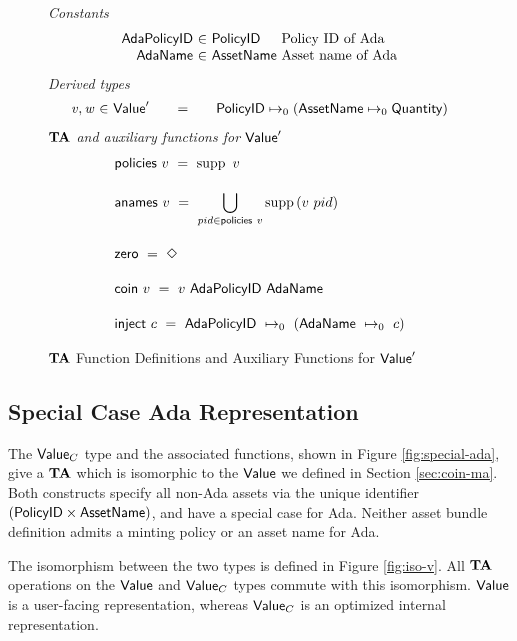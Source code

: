 \begin{figure*}[t!]
  \emph{Constants}
  \begin{equation*}
    \begin{array}{r@{~\in~}l@{~}lr}
      \mathsf{AdaPolicyID} & \PolicyID & \text{Policy ID of Ada} \\
      \mathsf{AdaName} & \AssetName & \text{Asset name of Ada}
    \end{array}
  \end{equation*}
  \emph{Derived types}
  \begin{equation*}
    \begin{array}{r@{~\in~}l@{\qquad=\qquad}lr}
      \var{v}, \var{w} & \Value'
      & \PolicyID \mapsto_0 ( \AssetName \mapsto_0 \Quantity )
    \end{array}
  \end{equation*}
  \emph{$\mathbf{TA}$ and auxiliary functions for $\mathsf{Value}'$}
  \begin{align*}
    & \fun{policies}~v ~=~ \supp{~v}
    \nextdef
    & \fun{anames}~v ~=~ \bigcup_{pid \in\fun{policies}{~v}} \supp{(v~pid)}
    \nextdef
    & \fun{zero} ~=~ \Nothing
    \nextdef
    & \fun{coin}~v ~=~ v~\mathsf{AdaPolicyID}~\mathsf{AdaName}
    \nextdef
    & \fun{inject}~c  ~=~ \mathsf{AdaPolicyID}~\mapsto_0~(\mathsf{AdaName}~\mapsto_0~c)
  \end{align*}
  \caption{$\mathbf{TA}$ Function Definitions and Auxiliary Functions for $\mathsf{Value}'$}
  \label{fig:no-special-ada}
\end{figure*}


\subsection{Special Case Ada Representation}
\label{sec:coin-value}

The $\mathsf{Value}_C$ type and the associated functions, shown in Figure \ref{fig:special-ada},
give a $\mathbf{TA}$ which is isomorphic to the $\mathsf{Value}$ we defined in
Section \ref{sec:coin-ma}. Both constructs
specify all non-Ada assets via the unique identifier $(\mathsf{PolicyID} \times \mathsf{AssetName})$, and
have a special case for Ada. Neither asset bundle definition
admits a minting policy or an asset name for Ada.

The isomorphism between the two types is defined in Figure \ref{fig:iso-v}.
All $\mathbf{TA}$ operations on the $\mathsf{Value}$ and $\mathsf{Value}_C$ types commute with this
isomorphism. $\mathsf{Value}$ is a user-facing representation, whereas $\mathsf{Value}_C$
is an optimized internal representation.

